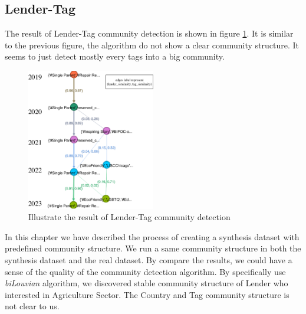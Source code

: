 \subsection{Lender-Tag}

The result of Lender-Tag community detection is shown in figure \ref{fig:LTag}.
It is similar to the previous figure, the algorithm do not show a clear community structure.
It seems to just detect mostly every tags into a big community.


\begin{figure}[H]
	\centering
	\includegraphics[width=0.5\textwidth]{images/LTag.pdf}
	\caption{Illustrate the result of Lender-Tag community detection}
	\label{fig:LTag}
\end{figure}



In this chapter we have described the process of creating a synthesis dataset with predefined community structure.
We run a same community structure in both the synthesis dataset and the real dataset.
By compare the results, we could have a sense of the quality of the community detection algorithm.
By specifically use \textit{biLouvian} algorithm,
we discovered stable community structure of Lender who interested in Agriculture Sector.
The Country and Tag community structure is not clear to us.
